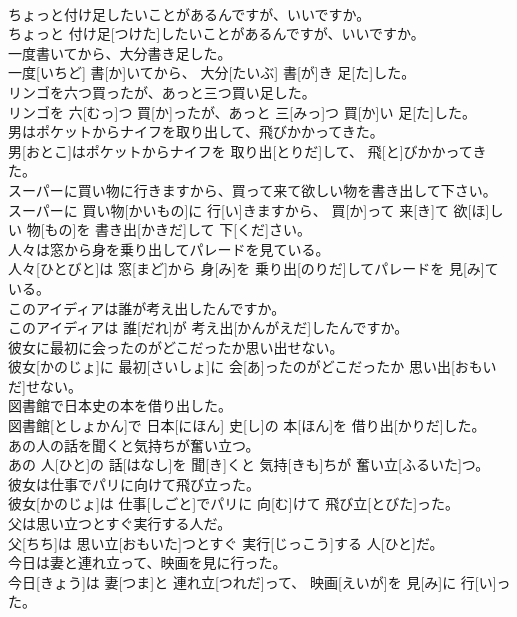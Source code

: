 \documentclass[8pt]{extreport}
\begin{document}
\begin{CJK}{UTF8}{min}
\\	ちょっと付け足したいことがあるんですが、いいですか。	
\\	ちょっと 付け足[つけた]したいことがあるんですが、いいですか。
\\	一度書いてから、大分書き足した。	
\\	一度[いちど] 書[か]いてから、 大分[たいぶ] 書[が]き 足[た]した。
\\	リンゴを六つ買ったが、あっと三つ買い足した。	
\\	リンゴを 六[むっ]つ 買[か]ったが、あっと 三[みっ]つ 買[か]い 足[た]した。
\\	男はポケットからナイフを取り出して、飛びかかってきた。	
\\	男[おとこ]はポケットからナイフを 取り出[とりだ]して、 飛[と]びかかってきた。
\\	スーパーに買い物に行きますから、買って来て欲しい物を書き出して下さい。	
\\	スーパーに 買い物[かいもの]に 行[い]きますから、 買[か]って 来[き]て 欲[ほ]しい 物[もの]を 書き出[かきだ]して 下[くだ]さい。
\\	人々は窓から身を乗り出してパレードを見ている。	
\\	人々[ひとびと]は 窓[まど]から 身[み]を 乗り出[のりだ]してパレードを 見[み]ている。
\\	このアイディアは誰が考え出したんですか。	
\\	このアイディアは 誰[だれ]が 考え出[かんがえだ]したんですか。
\\	彼女に最初に会ったのがどこだったか思い出せない。	
\\	彼女[かのじょ]に 最初[さいしょ]に 会[あ]ったのがどこだったか 思い出[おもいだ]せない。
\\	図書館で日本史の本を借り出した。	
\\	図書館[としょかん]で 日本[にほん] 史[し]の 本[ほん]を 借り出[かりだ]した。
\\	あの人の話を聞くと気持ちが奮い立つ。	
\\	あの 人[ひと]の 話[はなし]を 聞[き]くと 気持[きも]ちが 奮い立[ふるいた]つ。
\\	彼女は仕事でパリに向けて飛び立った。	
\\	彼女[かのじょ]は 仕事[しごと]でパリに 向[む]けて 飛び立[とびた]った。
\\	父は思い立つとすぐ実行する人だ。	
\\	父[ちち]は 思い立[おもいた]つとすぐ 実行[じっこう]する 人[ひと]だ。
\\	今日は妻と連れ立って、映画を見に行った。	
\\	今日[きょう]は 妻[つま]と 連れ立[つれだ]って、 映画[えいが]を 見[み]に 行[い]った。

\end{CJK}
\end{document}
